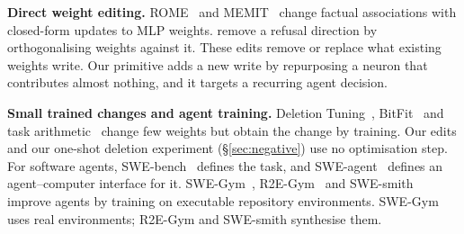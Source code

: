 \textbf{Direct weight editing.} ROME~\citep{Meng2022LocatingEditing} and MEMIT~\citep{Meng2022MasseditingMemory} change factual associations with closed-form updates to MLP weights. \citet{Arditi2024RefusalLanguage} remove a refusal direction by orthogonalising weights against it. These edits remove or replace what existing weights write. Our primitive adds a new write by repurposing a neuron that contributes almost nothing, and it targets a recurring agent decision.

\textbf{Small trained changes and agent training.} Deletion Tuning~\citep{Lu2026SurprisingEffectiveness}, BitFit~\citep{Benzaken2021BitfitSimple} and task arithmetic~\citep{Ilharco2022EditingModels} change few weights but obtain the change by training. Our edits and our one-shot deletion experiment (\S\ref{sec:negative}) use no optimisation step. For software agents, SWE-bench~\citep{Jimenez2023SwebenchCan} defines the task, and SWE-agent~\citep{Yang2024SweagentAgentcomputer} defines an agent--computer interface for it. SWE-Gym~\citep{Pan2024TrainingSoftware}, R2E-Gym~\citep{Jain2025R2egymProcedural} and SWE-smith~\citep{Yang2025SwesmithScaling} improve agents by training on executable repository environments. SWE-Gym uses real environments; R2E-Gym and SWE-smith synthesise them.
